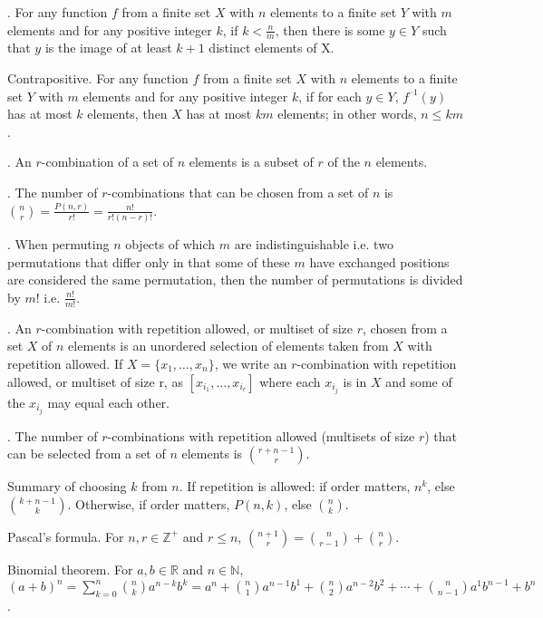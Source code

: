 \documentclass{slnotes}
\begin{document}
. For any function \(f\) from a finite set \(X\) with \(n\) elements to a finite set \(Y\) with \(m\) elements and for any positive integer \(k\), if \(k < \frac{n}{m}\), then there is some \(y \in Y\) such that \(y\) is the image of at least \(k + 1\) distinct elements of X.

Contrapositive. For any function \(f\) from a finite set \(X\) with \(n\) elements to a finite set \(Y\) with \(m\) elements and for any positive integer \(k\), if for each \(y\in Y\), \(f^{–1}(y)\) has at most \(k\) elements, then \(X\) has at most \(km\) elements; in other words, \(n \le km\).

. An \(r\)-combination of a set of \(n\) elements is a subset of \(r\) of the \(n\) elements.

. The number of \(r\)-combinations that can be chosen from a set of \(n\) is \(\binom{n}{r} = \frac{P(n, r)}{r!} = \frac{n!}{r!(n-r)!}\).

. When permuting \(n\) objects of which \(m\) are indistinguishable i.e. two permutations that differ only in that some of these \(m\) have exchanged positions are considered the same permutation, then the number of permutations is divided by \(m!\) i.e. \(\frac{n!}{m!}\).

. An \(r\)-combination with repetition allowed, or multiset of size \(r\), chosen from a set \(X\) of \(n\) elements is an unordered selection of elements taken from \(X\) with repetition allowed. If \(X = \{x_1, \hdots, x_n\}\), we write an \(r\)-combination with repetition allowed, or multiset of size r, as \([x_{i_1}, \hdots, x_{i_r}]\) where each \(x_{i_j}\) is in \(X\) and some of the \(x_{i_j}\) may equal each other.

. The number of \(r\)-combinations with repetition allowed (multisets of size \(r\)) that can be selected from a set of \(n\) elements is \(\binom{r+n-1}{r}\).

Summary of choosing \(k\) from \(n\). If repetition is allowed: if order matters, \(n^k\), else \(\binom{k+n-1}{k}\). Otherwise, if order matters, \(P(n, k)\), else \(\binom{n}{k}\).

 Pascal's formula. For \(n, r \in \mathbb{Z}^+\) and \(r \le n\), \(\binom{n+1}{r} = \binom{n}{r-1} + \binom{n}{r}\).

 Binomial theorem. For \(a, b \in \mathbb{R}\) and \(n \in \mathbb{N}\), \((a+b)^n = \sum^n_{k=0}\binom{n}{k}a^{n-k}b^k = a^n + \binom{n}{1}a^{n-1}b^1 + \binom{n}{2}a^{n-2}b^2 + \cdots + \binom{n}{n-1}a^1b^{n-1}+b^n\).
\end{document}
